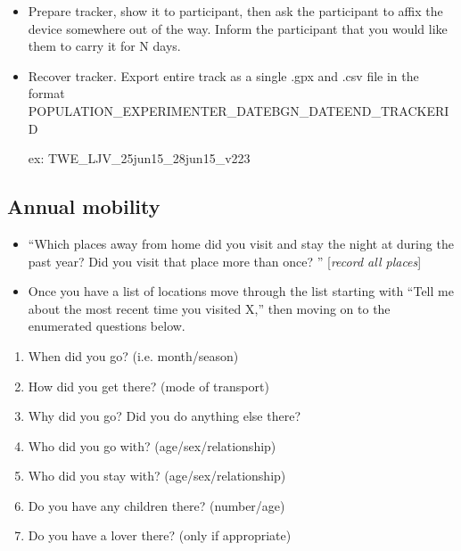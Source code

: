 \documentclass{article}
\begin{document}
\begin{itemize}
\item Prepare tracker, show it to participant, then ask the participant to affix the device somewhere out of the way.  Inform the participant that you would like them to carry it for N days.

\item Recover tracker. Export entire track as a single .gpx and .csv file in the format POPULATION\_EXPERIMENTER\_DATEBGN\_DATEEND\_TRACKERID  

ex: TWE\_LJV\_25jun15\_28jun15\_v223

\end{itemize}


\subsection{Annual mobility}

\begin{itemize}

\item ``Which places away from home did you visit and stay the night at during the past year? Did you visit that place more than once? '' [\emph{record all places}]

\item Once you have a list of locations move through the list starting with ``Tell me about the most recent time you visited X,'' then moving on to the enumerated questions below.

\end{itemize}

\begin{enumerate}
\item When did you go? (i.e. month/season)

\item How did you get there? (mode of transport)

\item Why did you go? Did you do anything else there?

\item Who did you go with? (age/sex/relationship)

\item Who did you stay with? (age/sex/relationship)

\item Do you have any children there? (number/age)

\item Do you have a lover there? (only if appropriate)

\end{enumerate}
\end{document}
